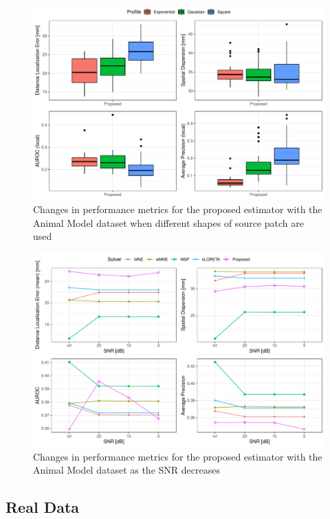 \begin{figure}
    \centering
    \includegraphics[width=0.9\linewidth]{img_stats/P_shape_EvalMetrics_Protocol04_30ALL.pdf}    
    \caption{Changes in performance metrics for the proposed estimator with the Animal Model dataset when different shapes of source patch are used}
    \label{fig:deets_pig}
\end{figure}

\begin{figure}
    \centering
    \includegraphics[width=0.9\linewidth]{img_stats/pig_SNRdegradation_EvalMetrics_protocol04_vol5k_pig.pdf}
    \caption{Changes in performance metrics for the proposed estimator with the Animal Model dataset as the SNR decreases}
    \label{fig:noise_degradation_pig}
\end{figure}

\subsection{Real Data}
\label{sec:real_data}

